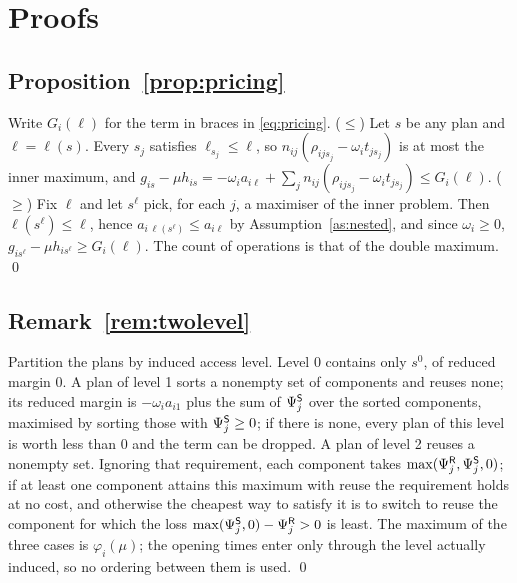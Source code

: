 \section{Proofs}\label{app:proofs}

\subsection*{Proposition~\ref{prop:pricing}}
Write $G_i(\ell)$ for the term in braces in \eqref{eq:pricing}. ($\le$) Let $s$ be any plan and $\ell=\ell(s)$.
Every $s_j$ satisfies $\ell_{s_j}\le\ell$, so $n_{ij}(\rho_{ijs_j}-\omega_it_{js_j})$ is at most the inner maximum,
and $g_{is}-\mu h_{is}=-\omega_ia_{i\ell}+\sum_jn_{ij}(\rho_{ijs_j}-\omega_it_{js_j})\le G_i(\ell)$. ($\ge$) Fix
$\ell$ and let $s^\ell$ pick, for each $j$, a maximiser of the inner problem. Then $\ell(s^\ell)\le\ell$, hence
$a_{i\,\ell(s^\ell)}\le a_{i\ell}$ by Assumption~\ref{as:nested}, and since $\omega_i\ge0$,
$g_{is^\ell}-\mu h_{is^\ell}\ge G_i(\ell)$. The count of operations is that of the double maximum. \qed

\subsection*{Remark~\ref{rem:twolevel}}
Partition the plans by induced access level. Level 0 contains only $s^0$, of reduced margin 0. A plan of level 1
sorts a nonempty set of components and reuses none; its reduced margin is $-\omega_ia_{i1}$ plus the sum of
$\Psi^{\mathsf{S}}_j$ over the sorted components, maximised by sorting those with $\Psi^{\mathsf{S}}_j\ge0$; if there is none,
every plan of this level is worth less than 0 and the term can be dropped. A plan of level 2 reuses a nonempty set.
Ignoring that requirement, each component takes $\max(\Psi^{\mathsf{R}}_j,\Psi^{\mathsf{S}}_j,0)$; if at least one component
attains this maximum with reuse the requirement holds at no cost, and otherwise the cheapest way to satisfy it is
to switch to reuse the component for which the loss $\max(\Psi^{\mathsf{S}}_j,0)-\Psi^{\mathsf{R}}_j>0$ is least. The maximum of
the three cases is $\varphi_i(\mu)$; the opening times enter only through the level actually induced, so no
ordering between them is used. \qed

